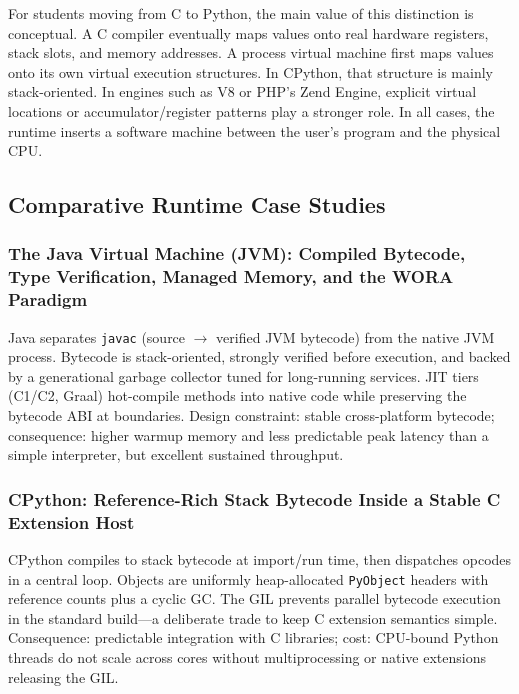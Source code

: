 \documentclass[a4paper,twoside]{report}
\begin{document}
For students moving from C to Python, the main value of this distinction is conceptual. A C compiler eventually maps values onto real hardware registers, stack slots, and memory addresses. A process virtual machine first maps values onto its own virtual execution structures. In CPython, that structure is mainly stack-oriented. In engines such as V8 or PHP's Zend Engine, explicit virtual locations or accumulator/register patterns play a stronger role. In all cases, the runtime inserts a software machine between the user's program and the physical CPU.




\subsection{Comparative Runtime Case Studies}

\subsubsection{The Java Virtual Machine (JVM): Compiled Bytecode, Type Verification, Managed Memory, and the WORA Paradigm}

Java separates \texttt{javac} (source $\rightarrow$ verified JVM bytecode) from the native JVM process. Bytecode is stack-oriented, strongly verified before execution, and backed by a generational garbage collector tuned for long-running services. JIT tiers (C1/C2, Graal) hot-compile methods into native code while preserving the bytecode ABI at boundaries. Design constraint: stable cross-platform bytecode; consequence: higher warmup memory and less predictable peak latency than a simple interpreter, but excellent sustained throughput.

\subsubsection{CPython: Reference-Rich Stack Bytecode Inside a Stable C Extension Host}

CPython compiles to stack bytecode at import/run time, then dispatches opcodes in a central loop. Objects are uniformly heap-allocated \texttt{PyObject} headers with reference counts plus a cyclic GC. The GIL prevents parallel bytecode execution in the standard build---a deliberate trade to keep C extension semantics simple. Consequence: predictable integration with C libraries; cost: CPU-bound Python threads do not scale across cores without multiprocessing or native extensions releasing the GIL.
\end{document}
